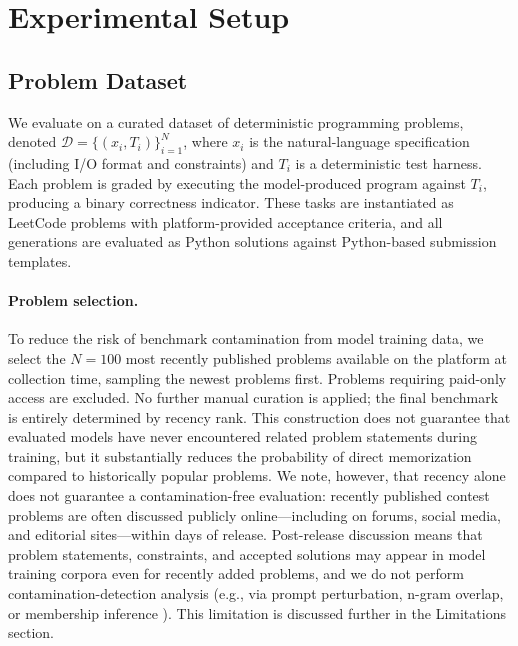 \documentclass[11pt,a4paper]{article}
\begin{document}
\section{Experimental Setup}

\subsection{Problem Dataset}
We evaluate on a curated dataset of deterministic programming problems, denoted $\mathcal{D}=\{(x_i, T_i)\}_{i=1}^{N}$, where $x_i$ is the natural-language specification (including I/O format and constraints) and $T_i$ is a deterministic test harness. Each problem is graded by executing the model-produced program against $T_i$, producing a binary correctness indicator. These tasks are instantiated as LeetCode problems with platform-provided acceptance criteria, and all generations are evaluated as Python solutions against Python-based submission templates.

\paragraph{Problem selection.} To reduce the risk of benchmark contamination from model training data, we select the $N=100$ most recently published problems available on the platform at collection time, sampling the newest problems first. Problems requiring paid-only access are excluded. No further manual curation is applied; the final benchmark is entirely determined by recency rank. This construction does not guarantee that evaluated models have never encountered related problem statements during training, but it substantially reduces the probability of direct memorization compared to historically popular problems. We note, however, that recency alone does not guarantee a contamination-free evaluation: recently published contest problems are often discussed publicly online---including on forums, social media, and editorial sites---within days of release. Post-release discussion means that problem statements, constraints, and accepted solutions may appear in model training corpora even for recently added problems, and we do not perform contamination-detection analysis (e.g., via prompt perturbation, n-gram overlap, or membership inference \cite{deng2023investigating}). This limitation is discussed further in the Limitations section.
\end{document}
